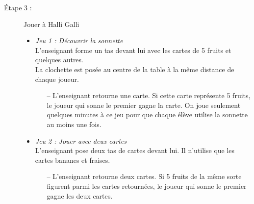 \begin{exercice*}
\begin{description}
      \item[Étape 3 :] Jouer à Halli Galli  
         \begin{itemize}
            \item {\it Jeu 1 : Découvrir la sonnette} \\
               L’enseignant forme un tas devant lui avec les cartes de 5 fruits et quelques autres. \\
               La clochette est posée au centre de la table à la même distance de chaque joueur.
               \begin{itemize}
                  \item[--] L’enseignant retourne une carte. Si cette carte représente 5 fruits, le joueur qui sonne le premier gagne la carte. On joue seulement quelques minutes à ce jeu pour que chaque élève utilise la sonnette au moins une fois. 
               \end{itemize}

      \item {\it Jeu 2 : Jouer avec deux cartes} \\
         L’enseignant pose deux tas de cartes devant lui. Il n’utilise que les cartes bananes et fraises.
         \begin{itemize}
            \item[--] L’enseignant retourne deux cartes. Si 5 fruits de la même sorte figurent parmi les cartes retournées, le joueur qui sonne le premier gagne les deux cartes. 
         \end{itemize}
         

\end{itemize}
\end{description}
\end{exercice*}
